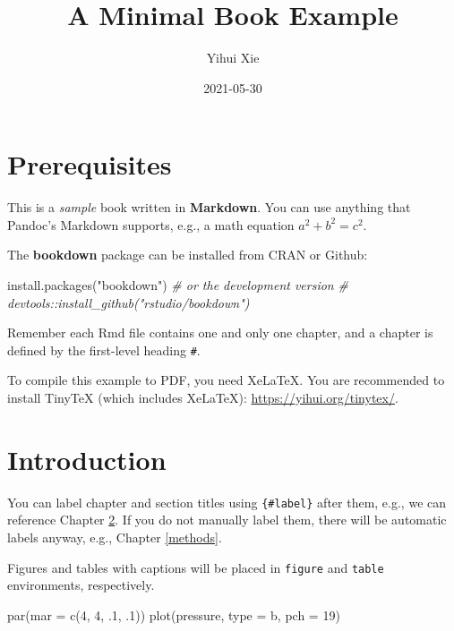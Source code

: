 \documentclass[
]{book}
\title{A Minimal Book Example}
\author{Yihui Xie}
\date{2021-05-30}
\newenvironment{Shaded}{\begin{snugshade}}{\end{snugshade}}
\newcommand{\AttributeTok}[1]{\textcolor[rgb]{0.77,0.63,0.00}{#1}}
\newcommand{\CommentTok}[1]{\textcolor[rgb]{0.56,0.35,0.01}{\textit{#1}}}
\newcommand{\DecValTok}[1]{\textcolor[rgb]{0.00,0.00,0.81}{#1}}
\newcommand{\FunctionTok}[1]{\textcolor[rgb]{0.00,0.00,0.00}{#1}}
\newcommand{\NormalTok}[1]{#1}
\newcommand{\StringTok}[1]{\textcolor[rgb]{0.31,0.60,0.02}{#1}}
\begin{document}
\maketitle

{
\setcounter{tocdepth}{1}
\tableofcontents
}
\hypertarget{prerequisites}{%
\chapter{Prerequisites}\label{prerequisites}}

This is a \emph{sample} book written in \textbf{Markdown}. You can use anything that Pandoc's Markdown supports, e.g., a math equation \(a^2 + b^2 = c^2\).

The \textbf{bookdown} package can be installed from CRAN or Github:

\begin{Shaded}
\begin{Highlighting}[]
\FunctionTok{install.packages}\NormalTok{(}\StringTok{"bookdown"}\NormalTok{)}
\CommentTok{\# or the development version}
\CommentTok{\# devtools::install\_github("rstudio/bookdown")}
\end{Highlighting}
\end{Shaded}

Remember each Rmd file contains one and only one chapter, and a chapter is defined by the first-level heading \texttt{\#}.

To compile this example to PDF, you need XeLaTeX. You are recommended to install TinyTeX (which includes XeLaTeX): \url{https://yihui.org/tinytex/}.

\hypertarget{intro}{%
\chapter{Introduction}\label{intro}}

You can label chapter and section titles using \texttt{\{\#label\}} after them, e.g., we can reference Chapter \ref{intro}. If you do not manually label them, there will be automatic labels anyway, e.g., Chapter \ref{methods}.

Figures and tables with captions will be placed in \texttt{figure} and \texttt{table} environments, respectively.

\begin{Shaded}
\begin{Highlighting}[]
\FunctionTok{par}\NormalTok{(}\AttributeTok{mar =} \FunctionTok{c}\NormalTok{(}\DecValTok{4}\NormalTok{, }\DecValTok{4}\NormalTok{, .}\DecValTok{1}\NormalTok{, .}\DecValTok{1}\NormalTok{))}
\FunctionTok{plot}\NormalTok{(pressure, }\AttributeTok{type =} \StringTok{\textquotesingle{}b\textquotesingle{}}\NormalTok{, }\AttributeTok{pch =} \DecValTok{19}\NormalTok{)}
\end{Highlighting}
\end{Shaded}
\end{document}
